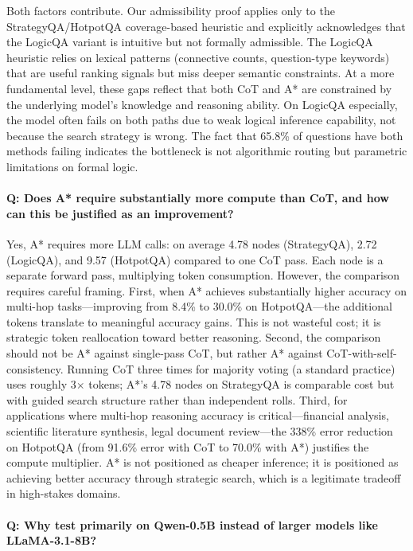 \documentclass[11pt]{article}
\begin{document}
Both factors contribute. Our admissibility proof applies only to the StrategyQA/HotpotQA coverage-based heuristic and explicitly acknowledges that the LogicQA variant is intuitive but not formally admissible. The LogicQA heuristic relies on lexical patterns (connective counts, question-type keywords) that are useful ranking signals but miss deeper semantic constraints. At a more fundamental level, these gaps reflect that both CoT and A* are constrained by the underlying model's knowledge and reasoning ability. On LogicQA especially, the model often fails on both paths due to weak logical inference capability, not because the search strategy is wrong. The fact that 65.8\% of questions have both methods failing indicates the bottleneck is not algorithmic routing but parametric limitations on formal logic.

\paragraph{Q: Does A* require substantially more compute than CoT, and how can this be justified as an improvement?}

Yes, A* requires more LLM calls: on average 4.78 nodes (StrategyQA), 2.72 (LogicQA), and 9.57 (HotpotQA) compared to one CoT pass. Each node is a separate forward pass, multiplying token consumption. However, the comparison requires careful framing. First, when A* achieves substantially higher accuracy on multi-hop tasks---improving from 8.4\% to 30.0\% on HotpotQA---the additional tokens translate to meaningful accuracy gains. This is not wasteful cost; it is strategic token reallocation toward better reasoning. Second, the comparison should not be A* against single-pass CoT, but rather A* against CoT-with-self-consistency. Running CoT three times for majority voting (a standard practice) uses roughly 3$\times$ tokens; A*'s 4.78 nodes on StrategyQA is comparable cost but with guided search structure rather than independent rolls. Third, for applications where multi-hop reasoning accuracy is critical---financial analysis, scientific literature synthesis, legal document review---the 338\% error reduction on HotpotQA (from 91.6\% error with CoT to 70.0\% with A*) justifies the compute multiplier. A* is not positioned as cheaper inference; it is positioned as achieving better accuracy through strategic search, which is a legitimate tradeoff in high-stakes domains.

\paragraph{Q: Why test primarily on Qwen-0.5B instead of larger models like LLaMA-3.1-8B?}
\end{document}
